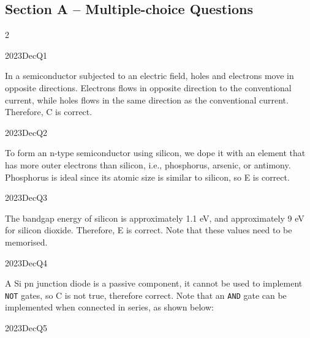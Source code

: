 
\subsection*{Section A -- Multiple-choice Questions}
\begin{multicols}{2}

\begin{qsolution}{2023}{Dec}{Q1}{\tgElectronics \tgElectronicsSemiconductor}

    In a semiconductor subjected to an electric field, holes and electrons move in opposite directions.
    Electrons flows in opposite direction to the conventional current, while holes flows in the same direction as the conventional current.
    Therefore, C is correct.
\end{qsolution}

\begin{qsolution}{2023}{Dec}{Q2}{\tgElectronics \tgElectronicsSemiconductor}

    To form an n-type semiconductor using silicon, we dope it with an element that has more outer electrons than silicon, i.e., phosphorus, arsenic, or antimony.
    Phosphorus is ideal since its atomic size is similar to silicon, so E is correct.
\end{qsolution}

\begin{qsolution}{2023}{Dec}{Q3}{\tgElectronics \tgElectronicsSemiconductor}

    The bandgap energy of silicon is approximately 1.1 eV, and approximately 9 eV for silicon dioxide.
    Therefore, E is correct.
    Note that these values need to be memorised.
\end{qsolution}

\begin{qsolution}{2023}{Dec}{Q4}{\tgElectronics \tgElectronicsDiodes}

    A Si pn junction diode is a passive component, it cannot be used to implement \texttt{NOT} gates, so C is not true, therefore correct.
    Note that an \texttt{AND} gate can be implemented when connected in series, as shown below:
\end{qsolution}

\begin{qsolution}{2023}{Dec}{Q5}{\tgElectronics \tgElectronicsBJT}


\end{qsolution}
\end{multicols}
